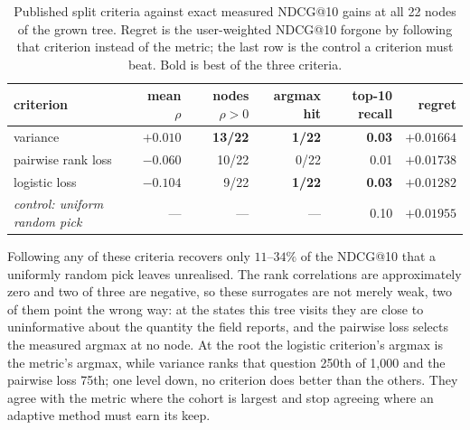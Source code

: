 \documentclass[runningheads]{llncs}
\begin{document}
\begin{table}[tbp]
\centering
\caption{Published split criteria against exact measured NDCG@10 gains at all 22 nodes of the grown
tree. Regret is the user-weighted NDCG@10 forgone by following that criterion instead of the metric;
the last row is the control a criterion must beat. Bold is best of the three criteria.}
\label{tab:criterion}
\small
\begin{tabular}{lrrrrr}
\toprule
criterion & mean $\rho$ & nodes $\rho{>}0$ & argmax hit & top-10 recall & regret \\
\midrule
variance~\cite{golbandi2011adaptive} & $\mathbf{+0.010}$ & \textbf{13/22} & \textbf{1/22} & \textbf{0.03} & $+0.01664$ \\
pairwise rank loss~\cite{hu2013interview} & $-0.060$ & 10/22 & 0/22 & 0.01 & $+0.01738$ \\
logistic loss~\cite{hu2013interview} & $-0.104$ & 9/22 & \textbf{1/22} & \textbf{0.03} & $\mathbf{+0.01282}$ \\
\midrule
\emph{control: uniform random pick} & --- & --- & --- & 0.10 & $+0.01955$ \\
\bottomrule
\end{tabular}
\end{table}

Following any of these criteria recovers only $11$--$34\%$ of the NDCG@10 that a uniformly random
pick leaves unrealised. The rank correlations are approximately zero and two of three are negative,
so these surrogates are not merely weak, two of them point the wrong way: at the states this tree visits they are close to uninformative about
the quantity the field reports, and the pairwise loss selects the measured argmax at no node. At the
root the logistic criterion's argmax is the metric's argmax, while variance ranks that question 250th
of 1{,}000 and the pairwise loss 75th; one level down, no criterion does better than the others. They
agree with the metric where the cohort is largest and stop agreeing where an adaptive method must
earn its keep.
\end{document}
